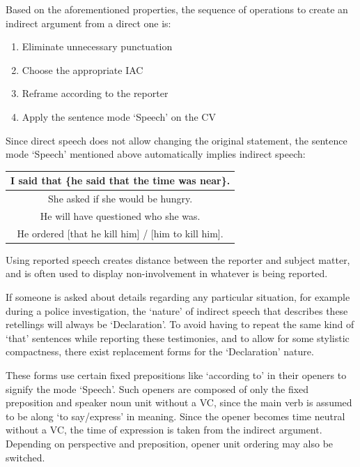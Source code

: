 Based on the aforementioned properties,  the sequence of operations to create an indirect argument from a direct one is: 
\begin{enumerate}
\item Eliminate unnecessary punctuation
\item Choose the appropriate IAC
\item Reframe according to the reporter
\item Apply the sentence mode `Speech' on the CV
\end{enumerate}
Since  direct speech does not allow changing the original statement, the sentence mode `Speech' mentioned above automatically implies  indirect speech:
\begin{example}
    \begin{tabular}{c}
        I said that \{he said that the time was near\}.\\\hline  She  asked if she would be  hungry. \\\hline He will have questioned who she was.\\\hline
        He ordered [that he kill him] / [him to  kill him].
    \end{tabular}
\end{example}
Using reported speech creates  distance between the reporter and subject matter, and is often used to display non-involvement in whatever is being reported.

If someone is asked about details regarding any particular situation, for example  during a police investigation, the `nature' of  indirect speech that describes these retellings will always be `Declaration'. To avoid having to repeat the same kind of  `that' sentences while reporting these testimonies, and to allow for some stylistic compactness, there exist replacement forms for the `Declaration' nature. 

These forms use certain fixed  prepositions like `according to'  in their openers to signify the mode `Speech'. Such openers are composed of only the fixed preposition and speaker noun unit  without a VC, since the main verb is assumed to be along `to say/express' in meaning. Since the opener becomes time neutral without a VC, the time of expression is taken from the indirect argument. Depending on perspective and preposition, opener unit ordering may also be switched. 

